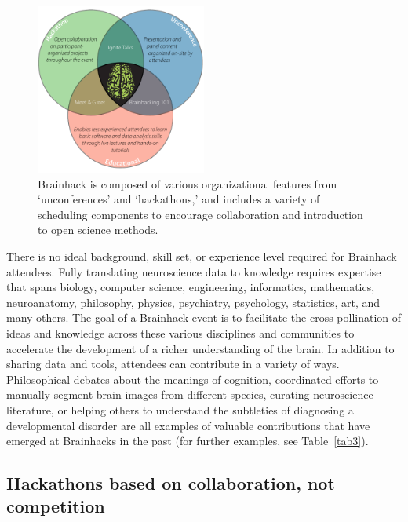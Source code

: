 \documentclass[11pt]{bmc_article_s50}
\begin{document}
\begin{figure}[htp]
\begin{center}
  \includegraphics[width=0.5\textwidth]{Figure_01}
  \caption{Brainhack \cite{brainhackorg} is composed of various organizational features from `unconferences' and `hackathons,' and includes a variety of scheduling components to encourage collaboration and introduction to open science methods.}
  \label{fig1}
\end{center}
\end{figure}

There is no ideal background, skill set, or experience level required for Brainhack attendees. Fully translating neuroscience data to knowledge requires expertise that spans biology, computer science, engineering, informatics, mathematics, neuroanatomy, philosophy, physics, psychiatry, psychology, statistics, art, and many others. The goal of a Brainhack event is to facilitate the cross-pollination of ideas and knowledge across these various disciplines and communities to accelerate the development of a richer understanding of the brain. In addition to sharing data and tools, attendees can contribute in a variety of ways. Philosophical debates about the meanings of cognition, coordinated efforts to manually segment brain images from different species, curating neuroscience literature, or helping others to understand the subtleties of diagnosing a developmental disorder are all examples of valuable contributions that have emerged at Brainhacks in the past (for further examples, see Table~\ref{tab3}).

\subsection*{Hackathons based on collaboration, not competition}
\end{document}
